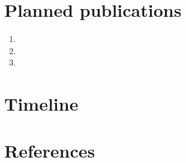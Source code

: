 \documentclass[12pt]{article}
\numberwithin{equation}{section}
\begin{document}
\section{Planned publications}

\begin{enumerate} [leftmargin=0.75cm,itemsep=0pt]
    \item %
    \item %
    \item %
\end{enumerate}



\section{Timeline}







\newpage
\section*{References}
\end{document}
